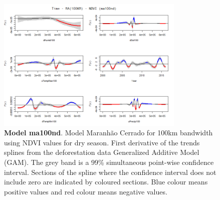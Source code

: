 \begin{table}


\begin{figure}[H]
 \centering
        \centering
        \includegraphics[width=0.8\textwidth]{ma100nd.png} %
        \caption[Model Cerrado Maranhão for 100km bandwidth using NDVI values for dry season. First derivative of the trends splines from the deforestation data Generalized Additive Model (GAM)]{\textbf{Model ma100nd}. Model Maranhão Cerrado for 100km bandwidth using NDVI values for dry season. First derivative of the trends splines from the deforestation data Generalized Additive Model (GAM). The grey band is a 99\% simultaneous point-wise confidence interval. Sections of the spline where the confidence interval does not include zero are indicated by coloured sections. Blue colour means positive values and red colour means negative values.}
\end{figure}
\end{table}

